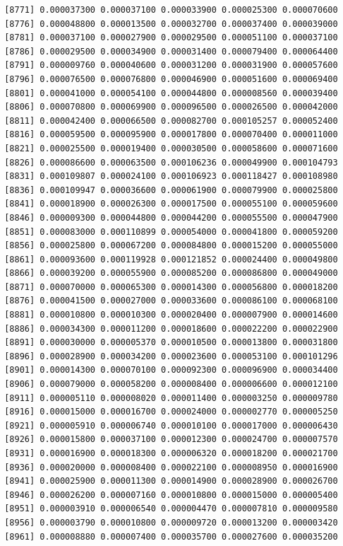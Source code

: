 \documentclass[]{article}
\begin{document}
\begin{verbatim}
 [8771] 0.000037300 0.000037100 0.000033900 0.000025300 0.000070600
 [8776] 0.000048800 0.000013500 0.000032700 0.000037400 0.000039000
 [8781] 0.000037100 0.000027900 0.000029500 0.000051100 0.000037100
 [8786] 0.000029500 0.000034900 0.000031400 0.000079400 0.000064400
 [8791] 0.000009760 0.000040600 0.000031200 0.000031900 0.000057600
 [8796] 0.000076500 0.000076800 0.000046900 0.000051600 0.000069400
 [8801] 0.000041000 0.000054100 0.000044800 0.000008560 0.000039400
 [8806] 0.000070800 0.000069900 0.000096500 0.000026500 0.000042000
 [8811] 0.000042400 0.000066500 0.000082700 0.000105257 0.000052400
 [8816] 0.000059500 0.000095900 0.000017800 0.000070400 0.000011000
 [8821] 0.000025500 0.000019400 0.000030500 0.000058600 0.000071600
 [8826] 0.000086600 0.000063500 0.000106236 0.000049900 0.000104793
 [8831] 0.000109807 0.000024100 0.000106923 0.000118427 0.000108980
 [8836] 0.000109947 0.000036600 0.000061900 0.000079900 0.000025800
 [8841] 0.000018900 0.000026300 0.000017500 0.000055100 0.000059600
 [8846] 0.000009300 0.000044800 0.000044200 0.000055500 0.000047900
 [8851] 0.000083000 0.000110899 0.000054000 0.000041800 0.000059200
 [8856] 0.000025800 0.000067200 0.000084800 0.000015200 0.000055000
 [8861] 0.000093600 0.000119928 0.000121852 0.000024400 0.000049800
 [8866] 0.000039200 0.000055900 0.000085200 0.000086800 0.000049000
 [8871] 0.000070000 0.000065300 0.000014300 0.000056800 0.000018200
 [8876] 0.000041500 0.000027000 0.000033600 0.000086100 0.000068100
 [8881] 0.000010800 0.000010300 0.000020400 0.000007900 0.000014600
 [8886] 0.000034300 0.000011200 0.000018600 0.000022200 0.000022900
 [8891] 0.000030000 0.000005370 0.000010500 0.000013800 0.000031800
 [8896] 0.000028900 0.000034200 0.000023600 0.000053100 0.000101296
 [8901] 0.000014300 0.000070100 0.000092300 0.000096900 0.000034400
 [8906] 0.000079000 0.000058200 0.000008400 0.000006600 0.000012100
 [8911] 0.000005110 0.000008020 0.000011400 0.000003250 0.000009780
 [8916] 0.000015000 0.000016700 0.000024000 0.000002770 0.000005250
 [8921] 0.000005910 0.000006740 0.000010100 0.000017000 0.000006430
 [8926] 0.000015800 0.000037100 0.000012300 0.000024700 0.000007570
 [8931] 0.000016900 0.000018300 0.000006320 0.000018200 0.000021700
 [8936] 0.000020000 0.000008400 0.000022100 0.000008950 0.000016900
 [8941] 0.000025900 0.000011300 0.000014900 0.000028900 0.000026700
 [8946] 0.000026200 0.000007160 0.000010800 0.000015000 0.000005400
 [8951] 0.000003910 0.000006540 0.000004470 0.000007810 0.000009580
 [8956] 0.000003790 0.000010800 0.000009720 0.000013200 0.000003420
 [8961] 0.000008880 0.000007400 0.000035700 0.000027600 0.000035200

\end{verbatim}
\end{document}
